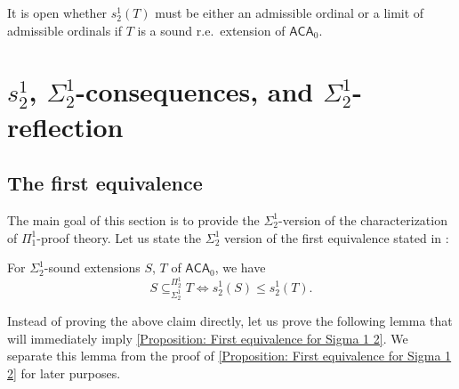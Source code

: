 \documentclass{mhkr}
\newcommand{\ACA}{\mathsf{ACA}}
\begin{document}
It is open whether $s^1_2(T)$ must be either an admissible ordinal or a limit of admissible ordinals if $T$ is a sound r.e.\ extension of $\ACA_0$.

\section{\texorpdfstring{$s^1_2$}{s 1 2}, \texorpdfstring{$\Sigma^1_2$}{Sigma 1 2}-consequences, and \texorpdfstring{$\Sigma^1_2$}{Sigma 1 2}-reflection} \label{Section: s12 metaproperties}
\subsection{The first equivalence}
The main goal of this section is to provide the $\Sigma^1_2$-version of the characterization of $\Pi^1_1$-proof theory.
Let us state the $\Sigma^1_2$ version of the first equivalence stated in \cite{Walsh2023characterizations}:
\begin{proposition} \label{Proposition: First equivalence for Sigma 1 2}
    For $\Sigma^1_2$-sound extensions $S$, $T$ of $\ACA_0$, we have
    \begin{equation*}
        S\subseteq^{\Pi^1_2}_{\Sigma^1_2} T\iff s^1_2(S)\le s^1_2(T).
    \end{equation*}
\end{proposition}

Instead of proving the above claim directly, let us prove the following lemma that will immediately imply \autoref{Proposition: First equivalence for Sigma 1 2}. We separate this lemma from the proof of \autoref{Proposition: First equivalence for Sigma 1 2} for later purposes.
\end{document}
